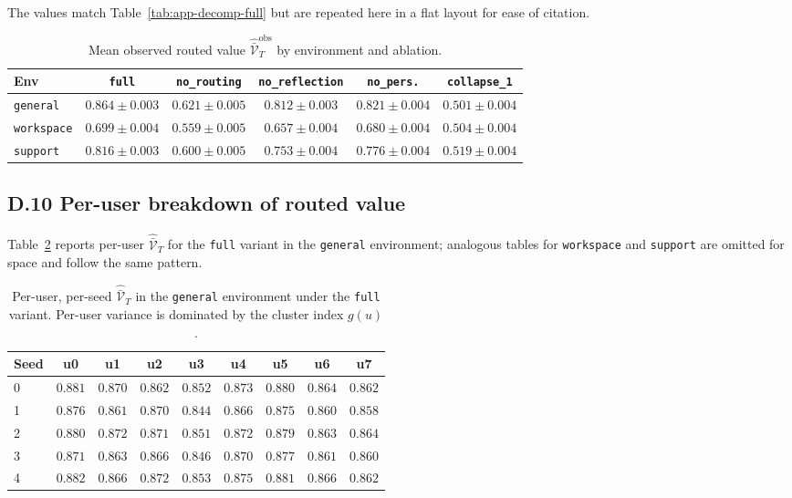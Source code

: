 \documentclass{article} %
\begin{document}
The values match Table~\ref{tab:app-decomp-full} but are repeated here in a flat layout for ease of citation.

\begin{table}[h]
\centering
\footnotesize
\setlength{\tabcolsep}{4pt}
\begin{tabular}{lccccc}
\toprule
Env & \texttt{full} & \texttt{no\_routing} & \texttt{no\_reflection} & \texttt{no\_pers.} & \texttt{collapse\_1} \\
\midrule
\texttt{general}   & $0.864 \pm 0.003$ & $0.621 \pm 0.005$ & $0.812 \pm 0.003$ & $0.821 \pm 0.004$ & $0.501 \pm 0.004$ \\
\texttt{workspace} & $0.699 \pm 0.004$ & $0.559 \pm 0.005$ & $0.657 \pm 0.004$ & $0.680 \pm 0.004$ & $0.504 \pm 0.004$ \\
\texttt{support}   & $0.816 \pm 0.003$ & $0.600 \pm 0.005$ & $0.753 \pm 0.004$ & $0.776 \pm 0.004$ & $0.519 \pm 0.004$ \\
\bottomrule
\end{tabular}
\caption{Mean observed routed value
\(\widehat{\bar{\mathcal V}}_T^{\mathrm{obs}}\) by environment and ablation.}
\label{tab:app-mean-reward}
\end{table}

\subsection{D.10 Per-user breakdown of routed value}

\label{app:tab-peruser}

Table~\ref{tab:app-peruser} reports per-user $\widehat{\bar{\mathcal V}}_T$ for the \texttt{full} variant in the \texttt{general} environment; analogous tables for \texttt{workspace} and \texttt{support} are omitted for space and follow the same pattern.

\begin{table}[h]
\centering
\small
\begin{tabular}{lcccccccc}
\toprule
Seed & u0 & u1 & u2 & u3 & u4 & u5 & u6 & u7 \\
\midrule
0 & $0.881$ & $0.870$ & $0.862$ & $0.852$ & $0.873$ & $0.880$ & $0.864$ & $0.862$ \\
1 & $0.876$ & $0.861$ & $0.870$ & $0.844$ & $0.866$ & $0.875$ & $0.860$ & $0.858$ \\
2 & $0.880$ & $0.872$ & $0.871$ & $0.851$ & $0.872$ & $0.879$ & $0.863$ & $0.864$ \\
3 & $0.871$ & $0.863$ & $0.866$ & $0.846$ & $0.870$ & $0.877$ & $0.861$ & $0.860$ \\
4 & $0.882$ & $0.866$ & $0.872$ & $0.853$ & $0.875$ & $0.881$ & $0.866$ & $0.862$ \\
\bottomrule
\end{tabular}
\caption{Per-user, per-seed $\widehat{\bar{\mathcal V}}_T$ in the \texttt{general} environment under the \texttt{full} variant. Per-user variance is dominated by the cluster index $g(u)$.}
\label{tab:app-peruser}
\end{table}
\end{document}
